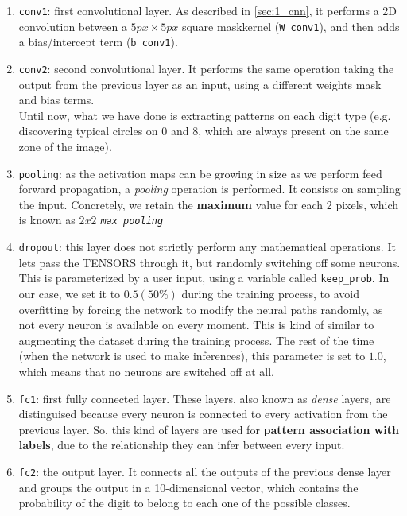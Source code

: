 		\begin{enumerate}
			\item \texttt{conv1}: first convolutional layer. As described in \autoref{sec:1_cnn}, it performs a 2D convolution between a $5px \times 5px$ square mask\/kernel (\texttt{W\_conv1}), and then adds a bias/intercept term (\texttt{b\_conv1}).\\
			\item \texttt{conv2}: second convolutional layer. It performs the same operation taking the output from the previous layer as an input, using a different weights mask and bias terms.\\
			
			Until now, what we have done is extracting patterns on each digit type (e.g. discovering typical circles on $0$ and $8$, which are always present on the same zone of the image).\\
			\item \texttt{pooling}: as the activation maps can be growing in size as we perform feed forward propagation, a \emph{pooling} operation is performed. It consists on sampling the input. Concretely, we retain the \textbf{maximum} value for each 2 pixels, which is known as \textit{$2x2$ \texttt{max pooling}}
			
			\item \texttt{dropout}: this layer does not strictly perform any mathematical operations. It lets pass the TENSORS through it, but randomly switching off some neurons. This is parameterized by a user input, using a variable called \texttt{keep\_prob}. In our case, we set it to $0.5 (50\%)$ during the training process, to avoid overfitting by forcing the network to modify the neural paths randomly, as not every neuron is available on every moment. This is kind of similar to augmenting the dataset during the training process. The rest of the time (when the network is used to make inferences), this parameter is set to $1.0$, which means that no neurons are switched off at all.\\
			\item \texttt{fc1}: first fully connected layer. These layers, also known as \emph{dense} layers, are distinguised because every neuron is connected to every activation from the previous layer. So, this kind of layers are used for \textbf{pattern association with labels}, due to the relationship they can infer between every input.\\
			\item \texttt{fc2}: the output layer. It connects all the outputs of the previous dense layer and groups the output in a 10-dimensional vector, which contains the probability of the digit to belong to each one of the possible classes.
		\end{enumerate}


